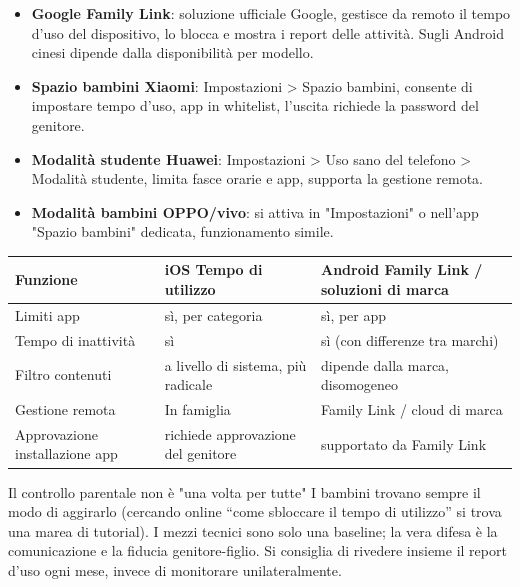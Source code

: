 
\begin{itemize}
  \item \textbf{Google Family Link}: soluzione ufficiale Google, gestisce da remoto il tempo d'uso del dispositivo, lo blocca e mostra i report delle attività. Sugli Android cinesi dipende dalla disponibilità per modello.
  \item \textbf{Spazio bambini Xiaomi}: Impostazioni > Spazio bambini, consente di impostare tempo d'uso, app in whitelist, l'uscita richiede la password del genitore.
  \item \textbf{Modalità studente Huawei}: Impostazioni > Uso sano del telefono > Modalità studente, limita fasce orarie e app, supporta la gestione remota.
  \item \textbf{Modalità bambini OPPO/vivo}: si attiva in "Impostazioni" o nell'app "Spazio bambini" dedicata, funzionamento simile.
\end{itemize}

\begin{center}
\begin{tabularx}{\linewidth}{|X|X|X|}
\hline
\textbf{Funzione} & \textbf{iOS Tempo di utilizzo} & \textbf{Android Family Link / soluzioni di marca} \tabularnewline
\hline
Limiti app & sì, per categoria & sì, per app \tabularnewline
Tempo di inattività & sì & sì (con differenze tra marchi) \tabularnewline
Filtro contenuti & a livello di sistema, più radicale & dipende dalla marca, disomogeneo \tabularnewline
Gestione remota & In famiglia & Family Link / cloud di marca \tabularnewline
Approvazione installazione app & richiede approvazione del genitore & supportato da Family Link \tabularnewline
\hline
\end{tabularx}
\end{center}

\begin{tcbwarn}{Il controllo parentale non è "una volta per tutte"}
I bambini trovano sempre il modo di aggirarlo (cercando online “come sbloccare il tempo di utilizzo” si trova una marea di tutorial). I mezzi tecnici sono solo una baseline; la vera difesa è la comunicazione e la fiducia genitore-figlio. Si consiglia di rivedere insieme il report d'uso ogni mese, invece di monitorare unilateralmente.

\end{tcbwarn}


